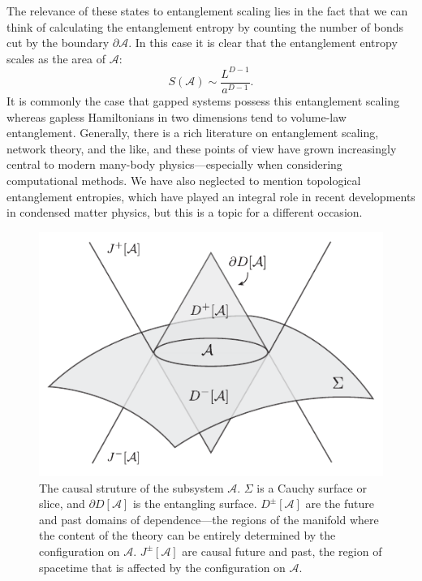\documentclass{report}
\begin{document}
The relevance of these states to entanglement scaling lies in the fact that we
can think of calculating the entanglement entropy by counting the number of
bonds cut by the boundary $ \partial \mathcal{A} $. In this case it is clear
that the entanglement entropy scales as the area of $ \mathcal{A} $:
\begin{equation*}
	S(\mathcal{A}) \sim  \frac{L^{D-1}}{a^{D-1}}.
\end{equation*}
It is commonly the case that gapped systems possess this entanglement scaling 
whereas gapless Hamiltonians in two dimensions tend to volume-law entanglement. 
Generally, there is a rich literature on entanglement scaling, network theory, 
and the like, and these points of view have grown increasingly central to modern 
many-body physics---especially when considering computational methods.
We have also neglected to mention topological entanglement entropies, which have 
played an integral role in recent developments in condensed matter physics, 
but this is a topic for a different occasion.

\begin{figure}[t]
	\centering
	\includegraphics[]{figs/december/causal-structure.pdf}
	\caption{The causal struture of the subsystem $ \mathcal{A} $. 
	$ \Sigma $ is a Cauchy surface or slice, and $ \partial D[\mathcal{A}] $ is 
	the entangling surface. $ D^{\pm}[\mathcal{A}] $
	are the future and past domains of dependence---the regions of the manifold 
	where the content of the theory can be entirely determined by the configuration 
	on $ \mathcal{A} $. $ J^\pm[\mathcal{A}] $ are causal future and past, 
	the region of spacetime that is affected by the configuration on $ \mathcal{A} $.}
	\label{fig:entanglement-causal-structure}
\end{figure}
\end{document}
